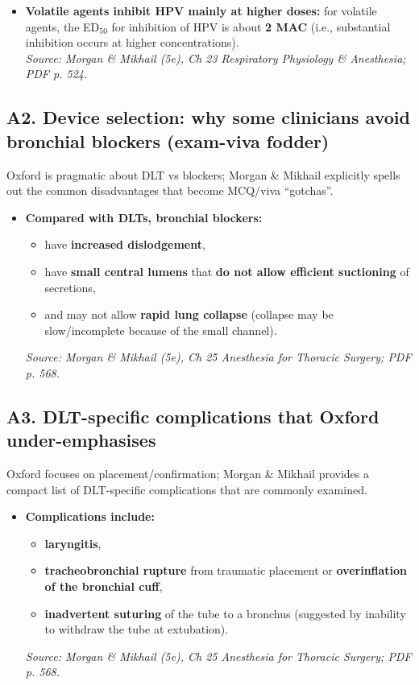 \documentclass[11pt,a4paper]{article}
\begin{document}
\begin{itemize}[leftmargin=*, itemsep=2pt]
  \item \textbf{Volatile agents inhibit HPV mainly at higher doses:} for volatile agents, the ED\(_{50}\) for inhibition of HPV is about \textbf{2 MAC} (i.e., substantial inhibition occurs at higher concentrations).\\
  \emph{Source: Morgan \& Mikhail (5e), Ch 23 Respiratory Physiology \& Anesthesia; PDF p. 524.}
\end{itemize}

\subsection{A2. Device selection: why some clinicians avoid bronchial blockers (exam-viva fodder)}
Oxford is pragmatic about DLT vs blockers; Morgan \& Mikhail explicitly spells out the common disadvantages that become MCQ/viva “gotchas”.

\begin{itemize}[leftmargin=*, itemsep=2pt]
  \item \textbf{Compared with DLTs, bronchial blockers:}
  \begin{itemize}[leftmargin=*, itemsep=2pt]
    \item have \textbf{increased dislodgement},
    \item have \textbf{small central lumens} that \textbf{do not allow efficient suctioning} of secretions,
    \item and may not allow \textbf{rapid lung collapse} (collapse may be slow/incomplete because of the small channel).
  \end{itemize}
  \emph{Source: Morgan \& Mikhail (5e), Ch 25 Anesthesia for Thoracic Surgery; PDF p. 568.}
\end{itemize}

\subsection{A3. DLT-specific complications that Oxford under-emphasises}
Oxford focuses on placement/confirmation; Morgan \& Mikhail provides a compact list of DLT-specific complications that are commonly examined.

\begin{itemize}[leftmargin=*, itemsep=2pt]
  \item \textbf{Complications include:}
  \begin{itemize}[leftmargin=*, itemsep=2pt]
    \item \textbf{laryngitis},
    \item \textbf{tracheobronchial rupture} from traumatic placement or \textbf{overinflation of the bronchial cuff},
    \item \textbf{inadvertent suturing} of the tube to a bronchus (suggested by inability to withdraw the tube at extubation).
  \end{itemize}
  \emph{Source: Morgan \& Mikhail (5e), Ch 25 Anesthesia for Thoracic Surgery; PDF p. 568.}
\end{itemize}
\end{document}
